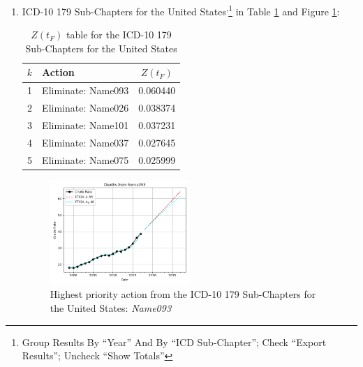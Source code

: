 \documentclass[12pt, a4paper, twocolumn]{article}
\begin{document}
\begin{enumerate}
  \item ICD-10 179 Sub-Chapters for the United States\cite{centers2017underlying}\textsuperscript{,}\footnote{Group Results By \enquote{Year} And By \enquote{ICD Sub-Chapter}; Check \enquote{Export Results}; Uncheck \enquote{Show Totals}} in Table \ref{table:ztable6} and Figure \ref{fig:k6}:
    \begin{table}[H]
      \centering
      \begin{tabular}{clc}
        \toprule
          $k$ & Action             & $Z(t_F)$ \\
        \midrule
          1   & Eliminate: Name093 & 0.060440 \\
          2   & Eliminate: Name026 & 0.038374 \\
          3   & Eliminate: Name101 & 0.037231 \\
          4   & Eliminate: Name037 & 0.027645 \\
          5   & Eliminate: Name075 & 0.025999 \\
        \bottomrule
      \end{tabular}
      \caption{$Z(t_F)$ table for the ICD-10 179 Sub-Chapters for the United States}
      \label{table:ztable6}
    \end{table}
    \begin{figure}[H]
      \centering
      \includegraphics[width=0.5\textwidth]{results/US_ICD10_SUB_CHAPTERS/Name093_ets.png}
      \caption{Highest priority action from the ICD-10 179 Sub-Chapters for the United States: \textit{Name093}}\label{fig:k6}
    \end{figure}
    

\end{enumerate}
\end{document}
